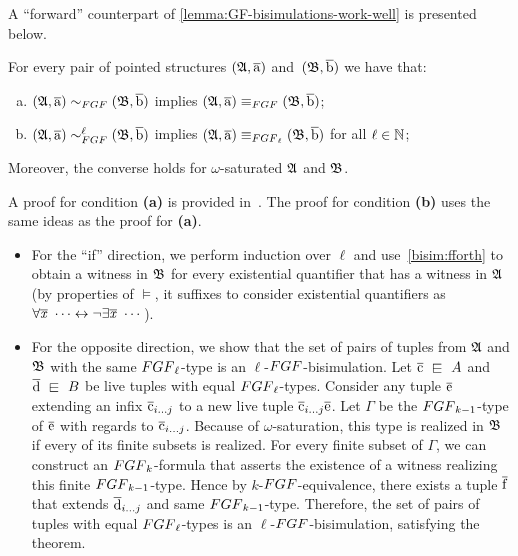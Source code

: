 A ``forward'' counterpart of \cref{lemma:GF-bisimulations-work-well} is presented below.
\begin{lemma}\label{lem:FGF-bisimulations-work-well}
For every pair of pointed structures $({\mathfrak{A}}, \overline{\mathrm{a}})$ and~$({\mathfrak{B}}, \overline{\mathrm{b}})$ we have that:
\begin{enumerate}[(a)]
\item $(\str{A}, \elemtuplea) \bisimto_{\FGF} (\str{B}, \elemtupleb)$ implies $(\str{A}, \elemtuplea) \equiv_{\FGF} (\str{B}, \elemtupleb)$;
\item $(\str{A}, \elemtuplea) \bisimto_{\FGF}^{\ell} (\str{B}, \elemtupleb)$ implies $(\str{A}, \elemtuplea) \equiv_{\FGF_\ell} (\str{B}, \elemtupleb)$ for all $\ell \in {\mathbb{N}}$;
\end{enumerate}
Moreover, the converse holds for $\omega$-saturated ${\mathfrak{A}}$ and ${\mathfrak{B}}$.
\end{lemma}
\begin{proofsketch}
  A proof for condition \textbf{(a)} is provided in~\cite[Lemma 3]{BednarczykJ22}.
  The proof for condition \textbf{(b)} uses the same ideas as the proof for \textbf{(a)}.
  \begin{itemize}
    \item
          For the ``if'' direction, we perform induction over $\ell$ and use~\ref{bisim:fforth} to obtain a witness in ${\mathfrak{B}}$ for every existential quantifier that has a witness in ${\mathfrak{A}}$ (by properties of $\models$, it suffixes to consider existential quantifiers as $\forall\overline{\mathit{x}}\ \cdots \leftrightarrow \lnot \exists \overline{\mathit{x}}\ \cdots$).
    \item
          For the opposite direction, we show that the set of pairs of tuples from ${\mathfrak{A}}$ and ${\mathfrak{B}}$ with the same $\FGF_{\ell}$-type is an $\ell$-$\FGF$-bisimulation.
          Let $\elemtuplec \sqin A$ and $\elemtupled \sqin B$ be live tuples with equal $\FGF_{\ell}$-types.
          Consider any tuple $\overline{\mathrm{e}}$ extending an infix $\overline{\mathrm{c}}_{i\ldots j}$ to a new live tuple $\overline{\mathrm{c}}_{i\ldots j}\overline{\mathrm{e}}$.
          Let $\Gamma$ be the $\FGF_{k-1}$-type of $\overline{\mathrm{e}}$ with regards to $\overline{\mathrm{c}}_{i\ldots j}$.
          Because of $\omega$-saturation, this type is realized in ${\mathfrak{B}}$ if every of its finite subsets is realized.
          For every finite subset of $\Gamma$, we can construct an $\FGF_{k}$-formula that asserts the existence of a witness realizing this finite $\FGF_{k-1}$-type.
          Hence by $k$-$\FGF$-equivalence, there exists a tuple $\overline{\mathrm{f}}$ that extends $\overline{\mathrm{d}}_{i\ldots j}$ and same $\FGF_{k-1}$-type.
          Therefore, the set of pairs of tuples with equal $\FGF_{\ell}$-types is an $\ell$-$\FGF$-bisimulation, satisfying the theorem.
  \end{itemize}
\end{proofsketch}


